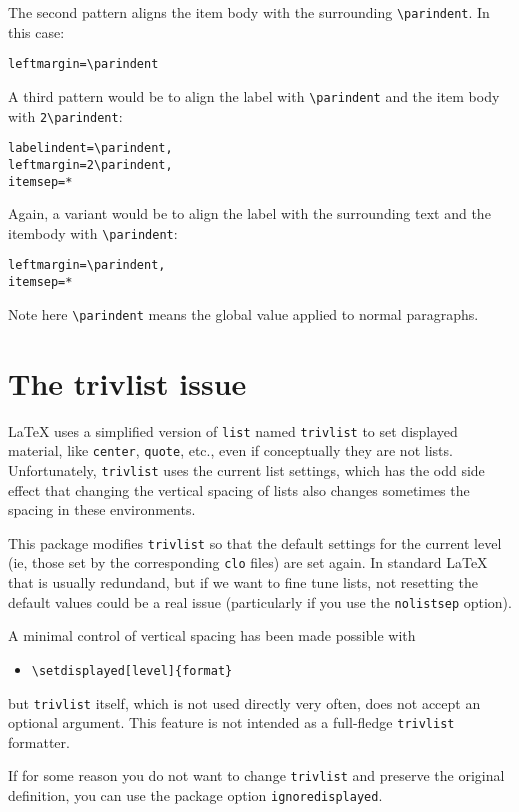 \documentclass{article}
\begin{document}
The second pattern aligns the item body with the surrounding
\verb|\parindent|. In this case:
\begin{verbatim}
leftmargin=\parindent
\end{verbatim}

A third pattern would be to align the label with \verb|\parindent|
and the item body with \verb|2\parindent|:
\begin{verbatim}
labelindent=\parindent,
leftmargin=2\parindent,
itemsep=*
\end{verbatim}
Again, a variant would be to align the label with the surrounding
text and the itembody with \verb|\parindent|:
\begin{verbatim}
leftmargin=\parindent,
itemsep=*
\end{verbatim}

Note here \verb|\parindent| means the global value applied
to normal paragraphs.

\section{The trivlist issue}

\LaTeX{} uses a simplified version of \verb|list| named 
\verb|trivlist| to set displayed material, like \verb|center|, 
\verb|quote|, etc., even if conceptually they are not lists. 
Unfortunately, \verb|trivlist| uses the current list settings, which 
has the odd side effect that changing the vertical spacing of lists 
also changes sometimes the spacing in these environments.

This package modifies \verb|trivlist| so that the default settings for 
the current level (ie, those set by the corresponding \verb|clo| 
files) are set again. In standard \LaTeX{} that is usually redundand, 
but if we want to fine tune lists, not resetting the default values 
could be a real issue (particularly if you use the \verb|nolistsep| 
option).

A minimal control of vertical spacing has been made possible with
\begin{itemize}
\item \verb|\setdisplayed[level]{format}|
\end{itemize}
but \verb|trivlist| itself, which is not used directly very
often, does not accept an optional argument. This feature
is not intended as a full-fledge \verb|trivlist| formatter.

If for some reason you do not want to change \verb|trivlist|
and preserve the original definition, you can use the
package option \verb|ignoredisplayed|.
\end{document}

